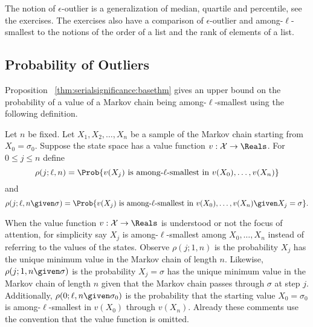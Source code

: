 \documentclass[12pt]{article}
\begin{document}
\begin{example}
    The notion of \( \epsilon \)-outlier is a generalization of median,
    quartile and percentile, see the exercises.  The exercises also have
    a comparison of \( \epsilon \)-outlier and among-\( \ell \)-smallest
    to the notions of the order of a list and the rank of elements of a
    list.
\end{example}

\subsection*{Probability of Outliers}

Proposition~%
\ref{thm:serialsignificance:basethm} gives an upper bound on the
probability of a value of a Markov chain being among-\( \ell \)-smallest
using the following definition.
\begin{definition}
    Let \( n \) be fixed.  Let \( X_1, X_2, \dots, X_n \) be a sample of
    the Markov chain starting from \( X_0 = \sigma_0 \). Suppose the
    state space has a value function \( v : \mathcal {X} \to \Reals \).
    For \( 0 \le j \le n \) define
    \[
        \rho(j; \ell, n) = \Prob{v(X_j) \text{ is among-\( \ell \)-smallest
        in } v(X_0), \dots, v(X_n) }
    \] and
    \[
        \rho(j; \ell, n \given \sigma) = \Prob{v(X_j) \text{ is among-\(
        \ell \)-smallest in } v(X_0), \dots, v(X_n)%
        \given X_j = \sigma }.
    \]
\end{definition}

When the value function \( v : \mathcal {X} \to \Reals \) is
understood or not the focus of attention, for simplicity
say \( X_j \) is among-\( \ell \)-smallest
among \( X_0, \dots, X_n \) instead of referring to the
values of the states.
Observe \( \rho(j; 1 ,n) \) is the probability \( X_j \) has the unique
minimum value in the Markov chain of length \( n \).  Likewise, \( \rho(j;
1, n \given \sigma) \) is the probability \( X_j = \sigma \) has the
unique minimum value in the Markov chain of length \( n \) given that
the Markov chain passes through \( \sigma \) at step \( j \).  Additionally, \(
\rho(0; \ell, n \given \sigma_0) \) is the probability that the starting
value \( X_0 = \sigma_0 \) is among-\( \ell \)-smallest in \( v(X_0) \)
through \( v(X_n) \).  Already these comments use the convention that
the value function is omitted.
\end{document}
